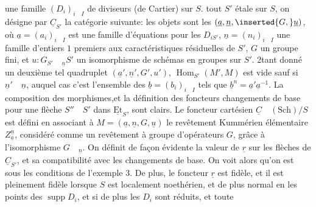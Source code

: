  une famille $(D_i)_{i\quad I}$ de diviseurs (de Cartier) sur $S$.  tout $S'$ étale sur $S$, on désigne par $\underline{C}_{S'}$ la catégorie suivante: les objets sont les   $(\underline{a},\underline{n},\inserted{G,}\underline{u})$, où $\underline{a}=(a_i)_{i\quad I}$ est une famille d'équations pour les $D_{iS'}$, $\underline{n}=(n_i)_{i\quad I}$ une famille d'entiers $1$ premiers aux caractéristiques résiduelles de $S'$,  $G$ un groupe fini, et $u:G_{S'}\quad{}_{\underline{n}}S'$ un isomorphisme de schémas en groupes sur $S'$. 2tant donné un deuxième tel quadruplet  $(\underline{a}',\underline{n}',G',u')$,  $\operatorname{Hom}_{S'}(M',M)$ est vide sauf si $\underline{n}'\quad\underline{n}$, auquel cas c'est l'ensemble des $\underline{b}=(b_i)_{i\quad I}$ tels que $\underline{b}^{n}=\underline{a}'\underline{a}^{-1}$. La composition des morphismes,et la définition des foncteurs changements de base pour une flèche $S''\quad S'$ dans $\underline{\mathrm{Et}}_S$, sont clairs. Le foncteur cartésien $\underline{C}\quad(\mathrm{Sch})/S$ est défini en associant à $M=(\underline{a},\underline{n},G,\underline{u})$ le revêtement Kummérien élémentaire $Z_{\underline{a}}^{\underline{n}}$,   considéré comme un revêtement à groupe d'opérateurs $G$, grâce à l'isomorphisme $G\quad{}_{\underline{n}}$. On définit de façon évidente la valeur de $\underline{r}$ sur les flèches de $\underline{C}_{S'}$, et sa compatibilité avec les changements de base. On voit alors qu'on est sous les conditions de l'exemple 3. De plus, le foncteur $\underline{r}$ est fidèle, et il est pleinement fidèle lorsque $S$ est  localement noethérien, et de plus normal en les points des $\operatorname{supp}D_i$, et si de plus les $D_i$ sont réduits, et toute 

